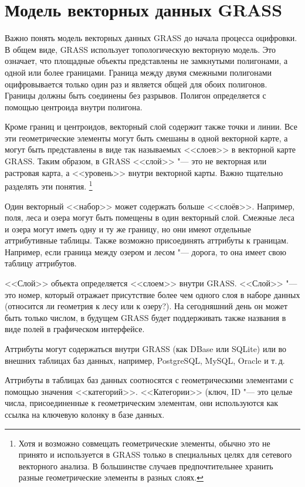 \section{Модель векторных данных GRASS}\label{label_vectmodel}

Важно понять модель векторных данных GRASS до начала процесса оцифровки.
В общем виде, GRASS использует топологическую векторную модель.
Это означает, что площадные объекты представлены не замкнутыми
полигонами, а одной или более границами. Граница между двумя смежными
полигонами оцифровывается только один раз и является общей для обоих
полигонов. Границы должны быть соединены без разрывов. Полигон
определяется с помощью центроида внутри полигона.

Кроме границ и центроидов, векторный слой содержит также точки и линии.
Все эти геометрические элементы могут быть смешаны в одной векторной
карте, а могут быть представлены в виде так называемых <<слоев>> в
векторной карте GRASS. Таким образом, в GRASS <<слой>> "--- это не
векторная или растровая карта, а <<уровень>> внутри векторной карты.
Важно тщательно разделять эти понятия.
\footnote{Хотя и возможно совмещать геометрические элементы, обычно это
не принято и используется в GRASS только в специальных целях для сетевого
векторного анализа. В большинстве случаев предпочтительнее хранить разные
геометрические элементы в разных слоях.}

Один векторный <<набор>> может содержать больше <<слоёв>>. Например,
поля, леса и озера могут быть помещены в один векторный слой. Смежные
леса и озера могут иметь одну и ту же границу, но они имеют отдельные
аттрибутивные таблицы. Также возможно присоединять аттрибуты к границам.
Например, если граница между озером и лесом "--- дорога, то она имеет
свою таблицу аттрибутов.

<<Слой>> объекта определяется <<слоем>> внутри GRASS. <<Слой>> "--- это
номер, который отражает присутствие более чем одного слоя в наборе
данных (относится ли геометрия к лесу или к озеру?). На сегодняшний день
он может быть только числом, в будущем GRASS будет поддерживать также
названия в виде полей в графическом интерфейсе.

Аттрибуты могут содержаться внутри  GRASS (как DBase
или SQLite) или во внешних таблицах баз данных, например, PostgreSQL,
MySQL, Oracle и т.\,д.

Аттрибуты в таблицах баз данных соотносятся с геометрическими
элементами с помощью значения <<категорий>>.
<<Категории>> (ключ, ID "--- это целые числа, присоединенные к
геометрическим элементам, они используются как ссылка на ключевую
колонку в базе данных.

